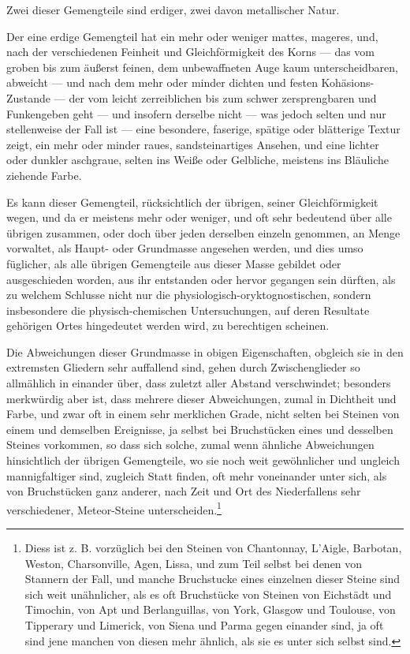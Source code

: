 \documentclass[a4paper, 11pt, oneside, german]{article}
\begin{document}
Zwei dieser Gemengteile sind erdiger, zwei davon metallischer Natur.

Der eine erdige Gemengteil hat ein mehr oder weniger mattes, mageres, und, nach der verschiedenen Feinheit und Gleichförmigkeit des Korns --- das vom groben bis zum äußerst feinen, dem unbewaffneten Auge kaum unterscheidbaren, abweicht --- und nach dem mehr oder minder dichten und festen Kohäsions-Zustande --- der vom leicht zerreiblichen bis zum schwer zersprengbaren und Funkengeben geht --- und insofern derselbe nicht --- was jedoch selten und nur stellenweise der Fall ist --- eine besondere, faserige, spätige oder blätterige Textur zeigt, ein mehr oder minder raues, sandsteinartiges Ansehen, und eine lichter oder dunkler aschgraue, selten ins Weiße oder Gelbliche, meistens ins Bläuliche ziehende Farbe.

Es kann dieser Gemengteil, rücksichtlich der übrigen, seiner Gleichförmigkeit wegen, und da er meistens mehr oder weniger, und oft sehr bedeutend über alle übrigen zusammen, oder doch über jeden derselben einzeln genommen, an Menge vorwaltet, als Haupt- oder Grundmasse angesehen werden, und dies umso füglicher, als alle übrigen Gemengteile aus dieser Masse gebildet oder ausgeschieden worden, aus ihr entstanden oder hervor gegangen sein dürften, als zu welchem Schlusse nicht nur die physiologisch-oryktognostischen, sondern insbesondere die physisch-chemischen Untersuchungen, auf deren Resultate gehörigen Ortes hingedeutet werden wird, zu berechtigen scheinen.

Die Abweichungen dieser Grundmasse in obigen Eigenschaften, obgleich sie in den extremsten Gliedern sehr auffallend sind, gehen durch Zwischenglieder so allmählich in einander über, dass zuletzt aller Abstand verschwindet; besonders merkwürdig aber ist, dass mehrere dieser Abweichungen, zumal in Dichtheit und Farbe, und zwar oft in einem sehr merklichen Grade, nicht selten bei Steinen von einem und demselben Ereignisse, ja selbst bei Bruchstücken eines und desselben Steines vorkommen, so dass sich solche, zumal wenn ähnliche Abweichungen hinsichtlich der übrigen Gemengteile, wo sie noch weit gewöhnlicher und ungleich mannigfaltiger sind, zugleich Statt finden, oft mehr voneinander unter sich, als von Bruchstücken ganz anderer, nach Zeit und Ort des Niederfallens sehr verschiedener, Meteor-Steine unterscheiden.\footnote{Diess ist z. B. vorzüglich bei den Steinen von Chantonnay, L'Aigle, Barbotan, Weston, Charsonville, Agen, Lissa, und zum Teil selbst bei denen von Stannern der Fall, und manche Bruchstucke eines einzelnen dieser Steine sind sich weit unähnlicher, als es oft Bruchstücke von Steinen von Eichstädt und Timochin, von Apt und Berlanguillas, von York, Glasgow und Toulouse, von Tipperary und Limerick, von Siena und Parma gegen einander sind, ja oft sind jene manchen von diesen mehr ähnlich, als sie es unter sich selbst sind.}
\end{document}
